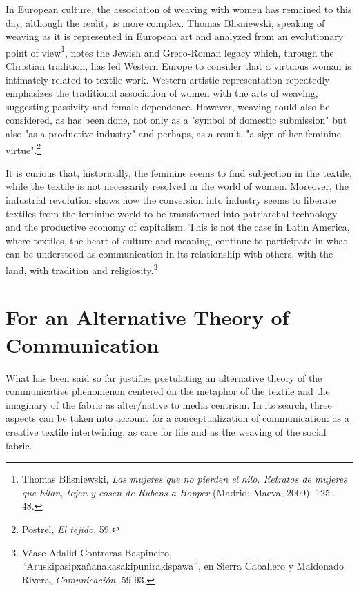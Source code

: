\documentclass{tufte-handout}
\begin{document}
In European culture, the association of weaving with women has remained
to this day, although the reality is more complex. Thomas Blisniewski,
speaking of weaving as it is represented in European art and analyzed
from an evolutionary point of view\footnote{Thomas Blisniewski,
  \emph{Las mujeres que no pierden el hilo. Retratos de mujeres que
  hilan, tejen y cosen de Rubens a Hopper} (Madrid: Maeva, 2009):
  125-48.}, notes the Jewish and Greco-Roman legacy which, through the
Christian tradition, has led Western Europe to consider that a virtuous
woman is intimately related to textile work. Western artistic
representation repeatedly emphasizes the traditional association of
women with the arts of weaving, suggesting passivity and female
dependence. However, weaving could also be considered, as has been done,
not only as a "symbol of domestic submission" but also "as a productive
industry" and perhaps, as a result, "a sign of her feminine
virtue".\footnote{Postrel, \emph{El tejido}, 59.}

It is curious that, historically, the feminine seems to find subjection
in the textile, while the textile is not necessarily resolved in the
world of women. Moreover, the industrial revolution shows how the
conversion into industry seems to liberate textiles from the feminine
world to be transformed into patriarchal technology and the productive
economy of capitalism. This is not the case in Latin America, where
textiles, the heart of culture and meaning, continue to participate in
what can be understood as communication in its relationship with others,
with the land, with tradition and religiosity.\footnote{Véase Adalid
  Contreras Baspineiro, ``Aruskipasipxañanakasakipunirakispawa'', en
  Sierra Caballero y Maldonado Rivera, \emph{Comunicación}, 59-93.}

\hypertarget{for-an-alternative-theory-of-communication}{%
\section{For an Alternative Theory of
Communication}\label{for-an-alternative-theory-of-communication}}

What has been said so far justifies postulating an alternative theory of
the communicative phenomenon centered on the metaphor of the textile and
the imaginary of the fabric as alter/native to media centrism. In its
search, three aspects can be taken into account for a conceptualization
of communication: as a creative textile intertwining, as care for life
and as the weaving of the social fabric.
\end{document}
